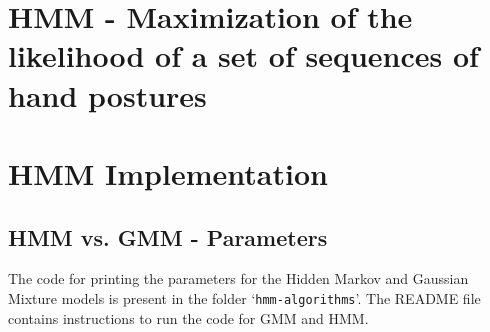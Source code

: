 \documentclass[parskip=half]{scrartcl}
\begin{document}



\newpage


\section{HMM - Maximization of the likelihood of a set of sequences of hand postures} %
\label{sec:hmm_maximization_of_the_likelihood_of_a_set_of_sequences_of_hand_postures}

    



\newpage


\section{HMM Implementation} %
\label{sec:hmm_implementation}


    \subsection{HMM vs. GMM - Parameters} %
    \label{sub:hmm_vs_gmm_parameters}

        The code for printing the parameters for the Hidden Markov and Gaussian Mixture models is present in the folder `\texttt{hmm-algorithms}'. The README file contains instructions to run the code for GMM and HMM.
\end{document}
